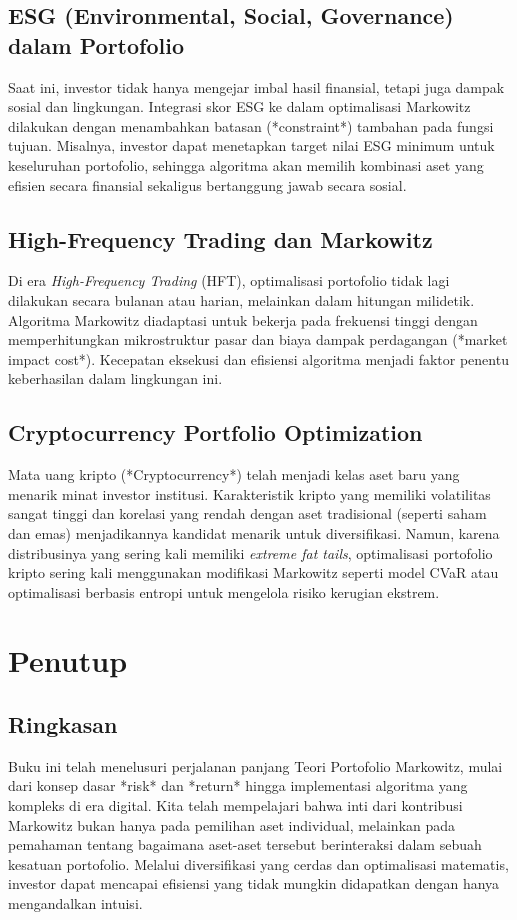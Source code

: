 \documentclass[12pt,a4paper]{book}
\begin{document}
\section{ESG (Environmental, Social, Governance) dalam Portofolio}
Saat ini, investor tidak hanya mengejar imbal hasil finansial, tetapi juga dampak sosial dan lingkungan. Integrasi skor ESG ke dalam optimalisasi Markowitz dilakukan dengan menambahkan batasan (*constraint*) tambahan pada fungsi tujuan. Misalnya, investor dapat menetapkan target nilai ESG minimum untuk keseluruhan portofolio, sehingga algoritma akan memilih kombinasi aset yang efisien secara finansial sekaligus bertanggung jawab secara sosial.

\section{High-Frequency Trading dan Markowitz}
Di era \textit{High-Frequency Trading} (HFT), optimalisasi portofolio tidak lagi dilakukan secara bulanan atau harian, melainkan dalam hitungan milidetik. Algoritma Markowitz diadaptasi untuk bekerja pada frekuensi tinggi dengan memperhitungkan mikrostruktur pasar dan biaya dampak perdagangan (*market impact cost*). Kecepatan eksekusi dan efisiensi algoritma menjadi faktor penentu keberhasilan dalam lingkungan ini.

\section{Cryptocurrency Portfolio Optimization}
Mata uang kripto (*Cryptocurrency*) telah menjadi kelas aset baru yang menarik minat investor institusi. Karakteristik kripto yang memiliki volatilitas sangat tinggi dan korelasi yang rendah dengan aset tradisional (seperti saham dan emas) menjadikannya kandidat menarik untuk diversifikasi. Namun, karena distribusinya yang sering kali memiliki \textit{extreme fat tails}, optimalisasi portofolio kripto sering kali menggunakan modifikasi Markowitz seperti model CVaR atau optimalisasi berbasis entropi untuk mengelola risiko kerugian ekstrem.

\chapter{Penutup}

\section{Ringkasan}
Buku ini telah menelusuri perjalanan panjang Teori Portofolio Markowitz, mulai dari konsep dasar *risk* dan *return* hingga implementasi algoritma yang kompleks di era digital. Kita telah mempelajari bahwa inti dari kontribusi Markowitz bukan hanya pada pemilihan aset individual, melainkan pada pemahaman tentang bagaimana aset-aset tersebut berinteraksi dalam sebuah kesatuan portofolio. Melalui diversifikasi yang cerdas dan optimalisasi matematis, investor dapat mencapai efisiensi yang tidak mungkin didapatkan dengan hanya mengandalkan intuisi.
\end{document}
